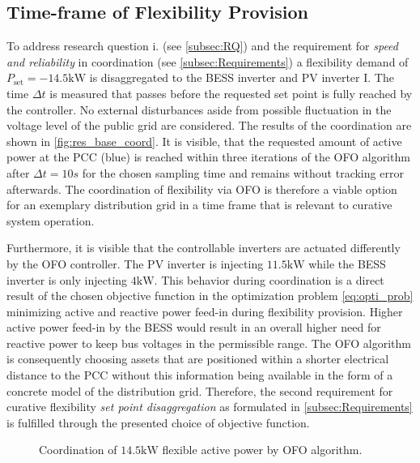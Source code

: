 \documentclass[conference,a4paper]{IEEEtran}
\begin{document}
\subsection{Time-frame of Flexibility Provision}
To address research question i. (see \ref{subsec:RQ}) and the requirement for \emph{speed and reliability} in coordination (see \ref{subsec:Requirements}) a flexibility demand of $P_{\text{set}} = -14.5 \text{kW}$ is disaggregated to the BESS inverter and PV inverter I. The time $\Delta t$ is measured that passes before the requested set point is fully reached by the controller. No external disturbances aside from possible fluctuation in the voltage level of the public grid are considered. The results of the coordination are shown in \autoref{fig:res_base_coord}. It is visible, that the requested amount of active power at the PCC (blue) is reached within three iterations of the OFO algorithm after $\Delta t=10s$ for the chosen sampling time and remains without tracking error afterwards. The coordination of flexibility via OFO is therefore a viable option for an exemplary distribution grid in a time frame that is relevant to curative system operation.

Furthermore, it is visible that the controllable inverters are actuated differently by the OFO controller. The PV inverter is injecting $11.5 \text{kW}$ while the BESS inverter is only injecting $4 \text{kW}$. This behavior during coordination is a direct result of the chosen objective function in the optimization problem \eqref{eq:opti_prob} minimizing active and reactive power feed-in during flexibility provision. Higher active power feed-in by the BESS would result in an overall higher need for reactive power to keep bus voltages in the permissible range. The OFO algorithm is consequently choosing assets that are positioned within a shorter electrical distance to the PCC without this information being available in the form of a concrete model of the distribution grid. Therefore, the second requirement for curative flexibility \emph{set point disaggregation} as formulated in \autoref{subsec:Requirements} is fulfilled through the presented choice of objective function.
\begin{figure}[b]
    \vspace{-1em}
    
    \caption{Coordination of $14.5 \text{kW}$ flexible active power by OFO algorithm.}
    \label{fig:res_base_coord}
\end{figure}
\end{document}
